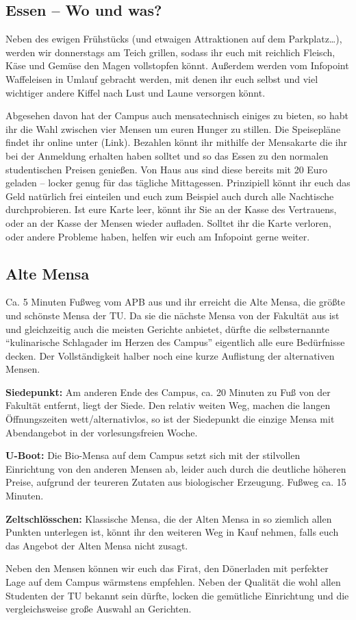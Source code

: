 \subsection*{Essen -- Wo und was?}
Neben des ewigen Frühstücks (und etwaigen Attraktionen auf dem Parkplatz…), werden wir donnerstags am Teich grillen, sodass ihr euch mit reichlich Fleisch, Käse und Gemüse den Magen vollstopfen könnt.
Außerdem werden vom Infopoint Waffeleisen in Umlauf gebracht werden, mit denen ihr euch selbst und viel wichtiger andere Kiffel nach Lust und Laune versorgen könnt.

Abgesehen davon hat der Campus auch mensatechnisch einiges zu bieten, so habt ihr die Wahl zwischen vier Mensen um euren Hunger zu stillen.
Die Speisepläne findet ihr online unter (Link).
Bezahlen könnt ihr mithilfe der Mensakarte die ihr bei der Anmeldung erhalten haben solltet und so das Essen zu den normalen studentischen Preisen genießen.
Von Haus aus sind diese bereits mit 20 Euro geladen -- locker genug für das tägliche Mittagessen.
Prinzipiell könnt ihr euch das Geld natürlich frei einteilen und euch zum Beispiel auch durch alle Nachtische durchprobieren.
Ist eure Karte leer, könnt ihr Sie an der Kasse des Vertrauens, oder an der Kasse der Mensen wieder aufladen.
Solltet ihr die Karte verloren, oder andere Probleme haben, helfen wir euch am Infopoint gerne weiter.

\subsection*{Alte Mensa}
Ca. 5 Minuten Fußweg vom APB aus und ihr erreicht die Alte Mensa, die größte und schönste Mensa der TU\@.
Da sie die nächste Mensa von der Fakultät aus ist und gleichzeitig auch die meisten Gerichte anbietet, dürfte die selbsternannte \enquote{kulinarische Schlagader im Herzen des Campus} eigentlich alle eure Bedürfnisse decken.
Der Vollständigkeit halber noch eine kurze Auflistung der alternativen Mensen.

\textbf{Siedepunkt: } Am anderen Ende des Campus, ca. 20 Minuten zu Fuß von der Fakultät entfernt, liegt der Siede.
Den relativ weiten Weg, machen die langen Öffnungszeiten wett/alternativlos, so ist der Siedepunkt die einzige Mensa mit Abendangebot in der vorlesungsfreien Woche.

\textbf{U-Boot: } Die Bio-Mensa auf dem Campus setzt sich mit der stilvollen Einrichtung von den anderen Mensen ab, leider auch durch die deutliche höheren Preise, aufgrund der teureren Zutaten aus biologischer Erzeugung.
Fußweg ca. 15 Minuten.

\textbf{Zeltschlösschen: } Klassische Mensa, die der Alten Mensa in so ziemlich allen Punkten unterlegen ist, könnt ihr den weiteren Weg in Kauf nehmen, falls euch das Angebot der Alten Mensa nicht zusagt.

Neben den Mensen können wir euch das Firat, den Dönerladen mit perfekter Lage auf dem Campus wärmstens empfehlen.
Neben der Qualität die wohl allen Studenten der TU bekannt sein dürfte, locken die gemütliche Einrichtung und die vergleichsweise große Auswahl an Gerichten.
